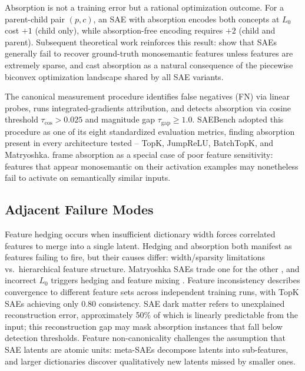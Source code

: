 \documentclass{article}
\begin{document}
Absorption is not a training error but a rational optimization outcome. For a parent-child pair $(p, c)$, an SAE with absorption encodes both concepts at $L_0$ cost $+1$ (child only), while absorption-free encoding requires $+2$ (child and parent). Subsequent theoretical work reinforces this result: \citet{cui2025limits} show that SAEs generally fail to recover ground-truth monosemantic features unless features are extremely sparse, and \citet{wright2025absorption} cast absorption as a natural consequence of the piecewise biconvex optimization landscape shared by all SAE variants.

The canonical measurement procedure identifies false negatives (FN) via linear probes, runs integrated-gradients attribution, and detects absorption via cosine threshold $\tau_{\cos} > 0.025$ and magnitude gap $\tau_{\text{gap}} \geq 1.0$. SAEBench \citep{karvonen2025saebench} adopted this procedure as one of its eight standardized evaluation metrics, finding absorption present in every architecture tested -- TopK, JumpReLU, BatchTopK, and Matryoshka. \citet{tian2025sensitivity} frame absorption as a special case of poor feature sensitivity: features that appear monosemantic on their activation examples may nonetheless fail to activate on semantically similar inputs.

\subsection{Adjacent Failure Modes}

Feature hedging \citep{chanin2025hedging} occurs when insufficient dictionary width forces correlated features to merge into a single latent. Hedging and absorption both manifest as features failing to fire, but their causes differ: width/sparsity limitations vs.\ hierarchical feature structure. Matryoshka SAEs trade one for the other \citep{chanin2025hedging}, and incorrect $L_0$ triggers hedging and feature mixing \citep{chanin2025sparse}. Feature inconsistency \citep{song2025inconsistency} describes convergence to different feature sets across independent training runs, with TopK SAEs achieving only 0.80 consistency. SAE dark matter \citep{engels2024dark} refers to unexplained reconstruction error, approximately 50\% of which is linearly predictable from the input; this reconstruction gap may mask absorption instances that fall below detection thresholds. Feature non-canonicality \citep{leask2025noncanonical} challenges the assumption that SAE latents are atomic units: meta-SAEs decompose latents into sub-features, and larger dictionaries discover qualitatively new latents missed by smaller ones.
\end{document}
